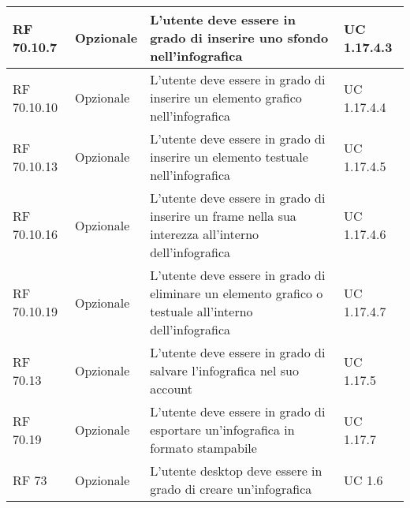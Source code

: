 {\begin{longtable} [c]{| p{2.5cm} | p{2.5cm} | p{6cm} |p{2.5cm}|}
 \hline 
RF 70.10.7 & Opzionale & L'utente deve essere in grado di inserire uno sfondo nell'infografica & UC 1.17.4.3\\ 
 \hline 
RF 70.10.10 & Opzionale & L'utente deve essere in grado di inserire un elemento grafico nell'infografica & UC 1.17.4.4\\ 
 \hline 
RF 70.10.13 & Opzionale & L'utente deve essere in grado di inserire un elemento testuale nell'infografica & UC 1.17.4.5\\ 
 \hline 
RF 70.10.16 & Opzionale & L'utente deve essere in grado di inserire un frame nella sua interezza all'interno dell'infografica & UC 1.17.4.6\\ 
 \hline 
RF 70.10.19 & Opzionale & L'utente deve essere in grado di eliminare un elemento grafico o testuale all'interno dell'infografica & UC 1.17.4.7\\ 
 \hline 
RF 70.13 & Opzionale & L'utente deve essere in grado di salvare l'infografica nel suo account & UC 1.17.5\\ 
 \hline 
RF 70.19 & Opzionale & L'utente deve essere in grado di esportare un'infografica in formato stampabile & UC 1.17.7\\ 
 \hline 
RF 73 & Opzionale & L'utente desktop deve essere in grado di creare un'infografica & UC 1.6\\ 
 \hline 
\end{longtable}}